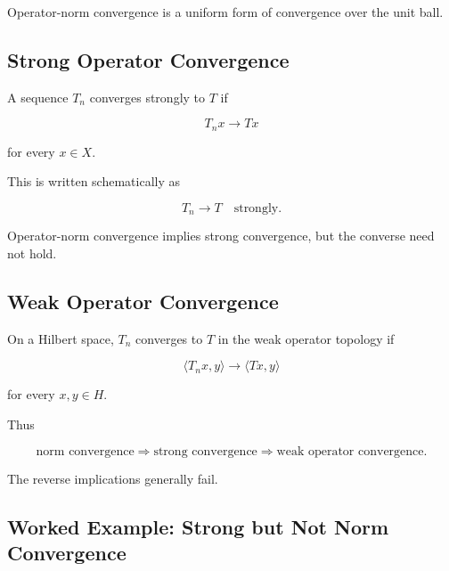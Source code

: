 Operator-norm convergence is a uniform form of convergence over the unit
ball.

\subsection{Strong Operator Convergence}
\label{subsec:strong-operator-convergence}

A sequence \(T_n\) converges strongly to \(T\) if

\[
\boxed{
T_nx\to Tx
}
\]

for every \(x\in X\).

This is written schematically as

\[
\boxed{
T_n\to T
\quad\text{strongly}.
}
\]

Operator-norm convergence implies strong convergence, but the converse
need not hold.

\subsection{Weak Operator Convergence}
\label{subsec:weak-operator-convergence}

On a Hilbert space, \(T_n\) converges to \(T\) in the weak operator
topology if

\[
\boxed{
\langle T_nx,y\rangle
\to
\langle Tx,y\rangle
}
\]

for every \(x,y\in H\).

Thus

\[
\boxed{
\text{norm convergence}
\Longrightarrow
\text{strong convergence}
\Longrightarrow
\text{weak operator convergence}.
}
\]

The reverse implications generally fail.

\subsection{Worked Example: Strong but Not Norm Convergence}
\label{subsec:worked-strong-not-norm}

